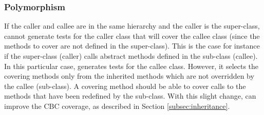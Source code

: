 \subsubsection{Polymorphism}
\label{sec:approach:polymorphism}


If the caller and callee are in the same hierarchy and the caller is the super-class, \cling cannot generate tests for the caller class that will cover the callee class (since the methods to cover are not defined in the super-class). 
This is the case for instance if the super-class (caller) calls abstract methods defined in the sub-class (callee).
In this particular case, \cling generates tests for the callee class. However, it selects the covering methods only from the inherited methods which are not overridden by the callee (sub-class). A covering method should be able to cover calls to the methods that have been redefined by the sub-class. With this slight change, \cling can improve the CBC coverage, as described in Section \ref{subsec:inheritance}.

